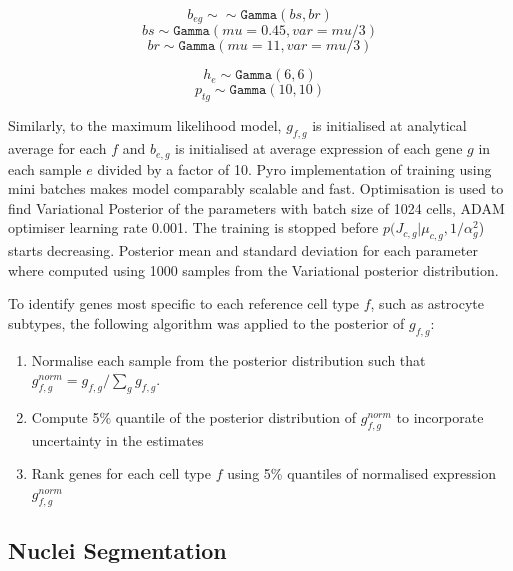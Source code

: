 \documentclass[11pt,a4paper]{article}
\begin{document}
\begin{equation} \label{eq:c2l_ref_prog_diff:5}
b_{eg} \sim \sim \mathtt{Gamma}(bs, br)
\end{equation}
\begin{equation} \label{eq:c2l_ref_prog_diff:6}
bs \sim \mathtt{Gamma}(mu=0.45, var=mu/3)
\end{equation}
\begin{equation} \label{eq:c2l_ref_prog_diff:7}
br \sim \mathtt{Gamma}(mu=11, var=mu/3)
\end{equation}

\begin{equation} \label{eq:c2l_ref_prog_diff:8}
h_e \sim \mathtt{Gamma}(6, 6)
\end{equation}
\begin{equation} \label{eq:c2l_ref_prog_diff:9}
p_{tg} \sim \mathtt{Gamma}(10, 10)
\end{equation}

Similarly, to the maximum likelihood model, $g_{f,g}$ is initialised at analytical average for each $f$ and $b_{e,g}$ is initialised at average expression of each gene $g$ in each sample $e$ divided by a factor of 10.  \newline
Pyro implementation of training using mini batches makes model comparably scalable and fast. Optimisation is used to find Variational Posterior of the parameters with batch size of 1024 cells, ADAM optimiser learning rate 0.001. The training is stopped before $p(J_{c,g} | \mu_{c,g}, 1 / \alpha_g^2$) starts decreasing. Posterior mean and standard deviation for each parameter where computed using 1000 samples from the Variational posterior distribution. \newline

To identify genes most specific to each reference cell type $f$, such as astrocyte subtypes, the following algorithm was applied to the posterior of $g_{f,g}$:
\begin{enumerate}
    \item Normalise each sample from the posterior distribution such that $g^{norm}_{f,g} = g_{f,g} / \sum_{g} g_{f,g}$.
    \item Compute 5\% quantile of the posterior distribution of $g^{norm}_{f,g}$ to incorporate uncertainty in the estimates
    \item Rank genes for each cell type $f$ using 5\% quantiles of normalised expression $g^{norm}_{f,g}$
\end{enumerate}


\subsection{Nuclei Segmentation} \label{c2l_segmentation}
\end{document}
